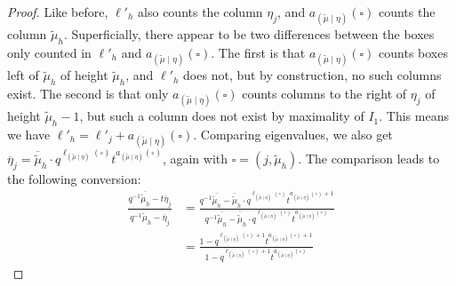 \documentclass[ALCO]{cedram}
\newcommand{\mutilde}{{\widetilde{\mu}}}
\newcommand{\mutildeeta}{{(\mutilde \mid \eta)}}
\newcommand{\leg}[1]{{\ell_{#1}(\square)}}
\newcommand{\armtwo}[1]{{a_{#1}(\square)}}
\newcommand{\lj}{\ell'_j}
\newcommand{\lh}{\ell'_h}
\begin{document}
\begin{proof}
Like before, $\lh$ also counts the column $\eta_j$, and $\armtwo{\mutildeeta}$ counts the column $\mutilde_h$. Superficially, there appear to be two differences between the boxes only counted in $\lh$ and $\armtwo{\mutildeeta}$. The first is that $\armtwo{\mutildeeta}$ counts boxes left of $\mutilde_h$ of height $\mutilde_h$, and $\lh$ does not, but by construction, no such columns exist. The second is that only $\armtwo{\mutildeeta}$ counts columns to the right of $\eta_j$ of height $\mutilde_h-1$, but such a column does not exist by maximality of $I_1$. This means we have $\lh = \lj+\armtwo{\mutildeeta}$. Comparing eigenvalues, we also get $\overline{\eta}_j = \overline{\mutilde}_h \cdot q^\leg{\mutildeeta} t^\armtwo{\mutildeeta}$, again with $\square = (j,\mutilde_h)$. The comparison leads to the following conversion:
\begin{align*}
    \frac{q^{-1} \overline{\mutilde_h} -t\overline{\eta}_j}{q^{-1} \overline{\mutilde_h} -\overline{\eta}_j} &= \frac{q^{-1} \overline{\mutilde_h} - \overline{\mutilde}_h \cdot q^\leg{\mutildeeta} t^{\armtwo{\mutildeeta}+1}}{q^{-1} \overline{\mutilde_h} -\overline{\mutilde}_h \cdot q^\leg{\mutildeeta} t^\armtwo{\mutildeeta}}\\
    &= \frac{1-q^{\leg{\mutildeeta}+1} t^{\armtwo{\mutildeeta}+1}}{1-q^{\leg{\mutildeeta}+1} t^\armtwo{\mutildeeta}}
\end{align*}


\end{proof}
\end{document}
